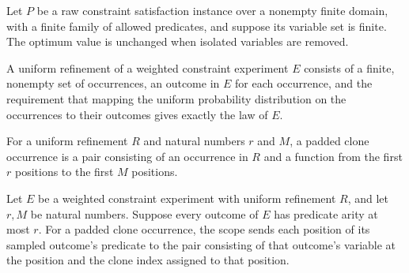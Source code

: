 \begin{theorem}
\label{FABL.RawCSPInstance.optimum_removeIsolatedVariables}
\leanok
{}
Let $P$ be a raw constraint satisfaction instance over a nonempty finite domain, with a
finite family of allowed predicates, and suppose its variable set is finite. The optimum
value is unchanged when isolated variables are removed.
\end{theorem}

\begin{definition}
\label{FABL.WeightedConstraintExperiment.UniformRefinement}
\leanok
{}
A uniform refinement of a weighted constraint experiment $E$ consists of a finite,
nonempty set of occurrences, an outcome in $E$ for each occurrence, and the requirement
that mapping the uniform probability distribution on the occurrences to their outcomes
gives exactly the law of $E$.
\end{definition}

\begin{definition}
\label{FABL.WeightedConstraintExperiment.UniformRefinement.PaddedCloneOccurrence}
\leanok
For a uniform refinement $R$ and natural numbers $r$ and $M$, a padded clone occurrence
is a pair consisting of an occurrence in $R$ and a function from the first $r$ positions
to the first $M$ positions.
\end{definition}

\begin{definition}
\label{FABL.WeightedConstraintExperiment.UniformRefinement.paddedCloneScope}
\leanok
{}
Let $E$ be a weighted constraint experiment with uniform refinement $R$, and let $r,M$
be natural numbers. Suppose every outcome of $E$ has predicate arity at most $r$. For a
padded clone occurrence, the scope sends each position of its sampled outcome's
predicate to the pair consisting of that outcome's variable at the position and the
clone index assigned to that position.
\end{definition}

